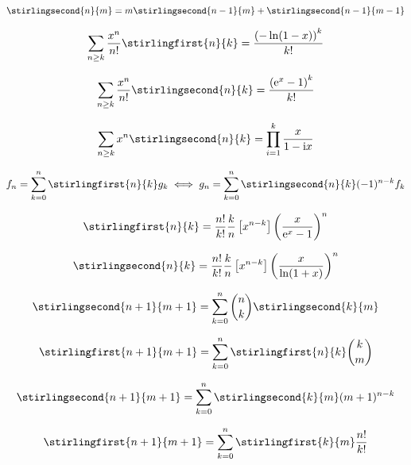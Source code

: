 \begin{equation}
    \stirlingsecond{n}{m}=m\stirlingsecond{n-1}{m}+\stirlingsecond{n-1}{m-1}
\end{equation}

\begin{equation}
    \sum_{n\geq k}\frac{x^n}{n!}\stirlingfirst{n}{k}=\frac{\left(-\ln(1-x)\right)^k}{k!}
\end{equation}

\begin{equation}
    \sum_{n\geq k}\frac{x^n}{n!}\stirlingsecond{n}{k}=\frac{\left(\mathrm{e}^x-1\right)^k}{k!}
\end{equation}

\begin{equation}
    \sum_{n\geq k}x^n\stirlingsecond{n}{k}=\prod_{i=1}^k\frac{x}{1-\mathrm{i}x}
\end{equation}

\begin{equation}
    f_n=\sum_{k=0}^n\stirlingfirst{n}{k}g_k \iff g_n=\sum_{k=0}^n\stirlingsecond{n}{k}(-1)^{n-k}f_k
\end{equation}

\begin{equation}
    \stirlingfirst{n}{k}=\frac{n!}{k!}\frac{k}{n}\left[x^{n-k}\right]\left(\frac{x}{\mathrm{e}^x-1}\right)^n
\end{equation}

\begin{equation}
    \stirlingsecond{n}{k}=\frac{n!}{k!}\frac{k}{n}\left[x^{n-k}\right]\left(\frac{x}{\ln(1+x)}\right)^n
\end{equation}

\begin{equation}
    \stirlingsecond{n+1}{m+1}=\sum_{k=0}^n\binom{n}{k}\stirlingsecond{k}{m}
\end{equation}

\begin{equation}
    \stirlingfirst{n+1}{m+1}=\sum_{k=0}^n\stirlingfirst{n}{k}\binom{k}{m}
\end{equation}

\begin{equation}
    \stirlingsecond{n+1}{m+1}=\sum_{k=0}^n\stirlingsecond{k}{m}(m+1)^{n-k}
\end{equation}

\begin{equation}
    \stirlingfirst{n+1}{m+1}=\sum_{k=0}^n\stirlingfirst{k}{m}\frac{n!}{k!}
\end{equation}


